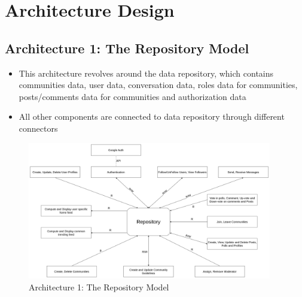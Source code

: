 \documentclass[11pt]{article}
\begin{document}
\section{ Architecture Design}

\subsection{Architecture 1: The Repository Model}

\begin{itemize}
    \item This architecture revolves around the data repository, which contains communities data, user data, conversation data, roles data for communities, posts/comments data for communities and authorization data
    \item All other components are connected to data repository through different connectors
\end{itemize}

\begin{figure}[H]
    \centering
    \includegraphics[width=0.95\textwidth]{../../assets/SA2.png}
    \caption{Architecture 1: The Repository Model}
\end{figure}
\end{document}
